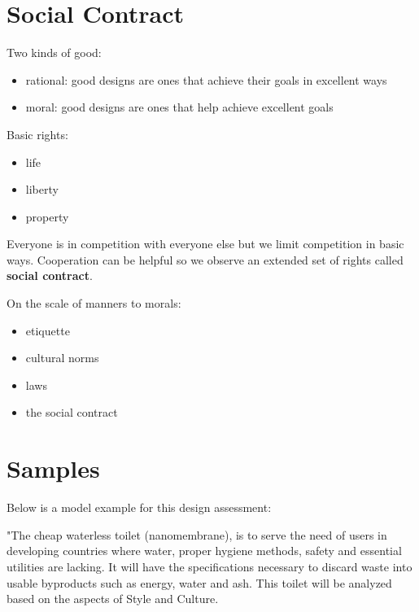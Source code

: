 \documentclass{article}
\begin{document}
\section*{Social Contract}
\label{sec:social_contract}

Two kinds of good:
\begin{itemize}
	\item rational: good designs are ones that achieve their goals in excellent ways
	\item moral: good designs are ones that help achieve excellent goals
\end{itemize}

 Basic rights:
 \begin{itemize}
  	\item life
  	\item liberty
  	\item property
  \end{itemize}

Everyone is in competition with everyone else but we limit competition in basic ways. Cooperation can be helpful so we observe an extended set of rights called \textbf{social contract}.

On the scale of manners to morals:
\begin{itemize}
	\item etiquette
	\item cultural norms
	\item laws
	\item the social contract
\end{itemize}

\section*{Samples}
\label{sec:samples}
Below is a model example for this design assessment:

"The cheap waterless toilet (nanomembrane), is to serve the need of users in developing countries where water, proper hygiene methods, safety and essential utilities are lacking. It will have the specifications necessary to discard waste into usable byproducts such as energy, water and ash. This toilet will be analyzed based on the aspects of Style and Culture.
\end{document}
